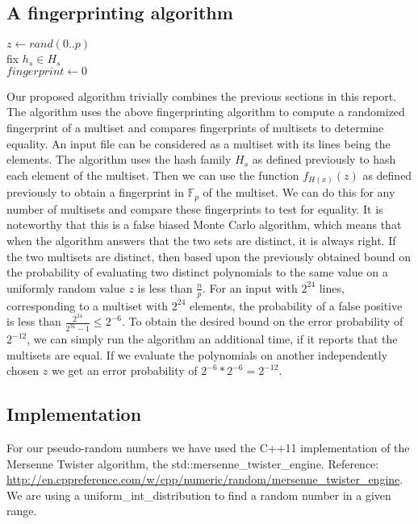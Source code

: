 \documentclass[article,a4paper,oneside]{article}
\newcommand{\+}[1]{\ensuremath{\boldsymbol{#1}}}
\begin{document}
\subsection*{A fingerprinting algorithm}
\begin{algorithm}[multisetfingerprinting]
	$z \gets rand(0..p)$\\
	fix $h_s \in H_s$\\
	$fingerprint \gets 0$\\

\end{algorithm}
Our proposed algorithm trivially combines the previous sections in this report.
	The algorithm uses the above fingerprinting algorithm to compute a randomized fingerprint of a multiset and compares fingerprints of multisets to determine equality.
An input file can be considered as a multiset with its lines being the elements.
The algorithm uses the hash family $H_s$ as defined previously to hash each element of the multiset. Then we can use the function $f_{H(x)}(z)$ as defined previously to obtain a fingerprint in $\mathbb{F}_p$ of the multiset.
We can do this for any number of multisets and compare these fingerprints to test for equality.
It is noteworthy that this is a false biased Monte Carlo algorithm, which means that when the algorithm answers that the two sets are distinct, it is always right.
If the two multisets are distinct, then based upon the previously obtained bound on the probability of evaluating two distinct polynomials to the same value on a uniformly random value $z$ is less than $\frac{n}{p}$.
For an input with $2^{24}$ lines, corresponding to a multiset with $2^{24}$ elements, the probability of a false positive is less than $\frac{2^{24}}{2^{31}-1} \leq 2^{-6}$. To obtain the desired bound on the error probability of $2^{-12}$, we can simply run the algorithm an additional time, if it reports that the multisets are equal. If we evaluate the polynomials on another independently chosen $z$ we get an error probability of $2^{-6}*2^{-6} = 2^{-12}$.

\subsection*{Implementation}

For our pseudo-random numbers we have used the C++11 implementation of the Mersenne Twister algorithm, the std::mersenne\_twister\_engine. Reference: \url{ http://en.cppreference.com/w/cpp/numeric/random/mersenne_twister_engine}. We are using a uniform\_int\_distribution to find a random number in a given range. 
\end{document}
